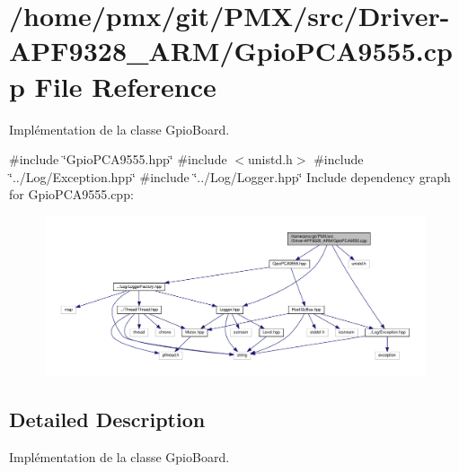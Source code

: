 \hypertarget{Driver-APF9328__ARM_2GpioPCA9555_8cpp}{}\section{/home/pmx/git/\+P\+M\+X/src/\+Driver-\/\+A\+P\+F9328\+\_\+\+A\+R\+M/\+Gpio\+P\+C\+A9555.cpp File Reference}
\label{Driver-APF9328__ARM_2GpioPCA9555_8cpp}


Implémentation de la classe Gpio\+Board.  


{\ttfamily \#include \char`\"{}Gpio\+P\+C\+A9555.\+hpp\char`\"{}}\newline
{\ttfamily \#include $<$unistd.\+h$>$}\newline
{\ttfamily \#include \char`\"{}../\+Log/\+Exception.\+hpp\char`\"{}}\newline
{\ttfamily \#include \char`\"{}../\+Log/\+Logger.\+hpp\char`\"{}}\newline
Include dependency graph for Gpio\+P\+C\+A9555.\+cpp\+:
\nopagebreak
\begin{figure}[H]
\begin{center}
\leavevmode
\includegraphics[width=350pt]{Driver-APF9328__ARM_2GpioPCA9555_8cpp__incl}
\end{center}
\end{figure}


\subsection{Detailed Description}
Implémentation de la classe Gpio\+Board. 

